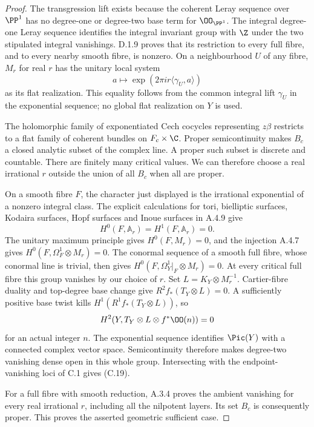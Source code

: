 \begin{proof}
The transgression lift exists because the coherent Leray sequence over $\PP^1$ has no degree-one or degree-two base term for $\OO_{\PP^1}$. The integral degree-one Leray sequence identifies the integral invariant group with $\Z$ under the two stipulated integral vanishings. D.1.9 proves that its restriction to every full fibre, and to every nearby smooth fibre, is nonzero. On a neighbourhood $U$ of any fibre, $M_r$ for real $r$ has the unitary local system
\[
 a\longmapsto\exp(2\pi i r\langle\gamma_U,a\rangle)
\]
as its flat realization. This equality follows from the common integral lift $\gamma_U$ in the exponential sequence; no global flat realization on $Y$ is used.

The holomorphic family of exponentiated Cech cocycles representing $z\beta$ restricts to a flat family of coherent bundles on $F_c\times\C$. Proper semicontinuity makes $B_c$ a closed analytic subset of the complex line. A proper such subset is discrete and countable. There are finitely many critical values. We can therefore choose a real irrational $r$ outside the union of all $B_c$ when all are proper.

On a smooth fibre $F$, the character just displayed is the irrational exponential of a nonzero integral class. The explicit calculations for tori, bielliptic surfaces, Kodaira surfaces, Hopf surfaces and Inoue surfaces in A.4.9 give
\[
 H^0(F,\mathbb A_r)=H^1(F,\mathbb A_r)=0.
\]
The unitary maximum principle gives $H^0(F,M_r)=0$, and the injection A.4.7 gives $H^0(F,\Omega_F^1\otimes M_r)=0$. The conormal sequence of a smooth full fibre, whose conormal line is trivial, then gives
$H^0(F,\Omega_Y^1|_F\otimes M_r)=0$.
At every critical full fibre this group vanishes by our choice of $r$. Set $L=K_Y\otimes M_r^{-1}$. Cartier-fibre duality and top-degree base change give $R^2f_*(T_Y\otimes L)=0$. A sufficiently positive base twist kills $H^1(R^1f_*(T_Y\otimes L))$, so
\[
 H^2(Y,T_Y\otimes L\otimes f^*\OO(n))=0
\]
for an actual integer $n$. The exponential sequence identifies $\Pic(Y)$ with a connected complex vector space. Semicontinuity therefore makes degree-two vanishing dense open in this whole group. Intersecting with the endpoint-vanishing loci of C.1 gives (C.19).

For a full fibre with smooth reduction, A.3.4 proves the ambient vanishing for every real irrational $r$, including all the nilpotent layers. Its set $B_c$ is consequently proper. This proves the asserted geometric sufficient case.


\end{proof}
